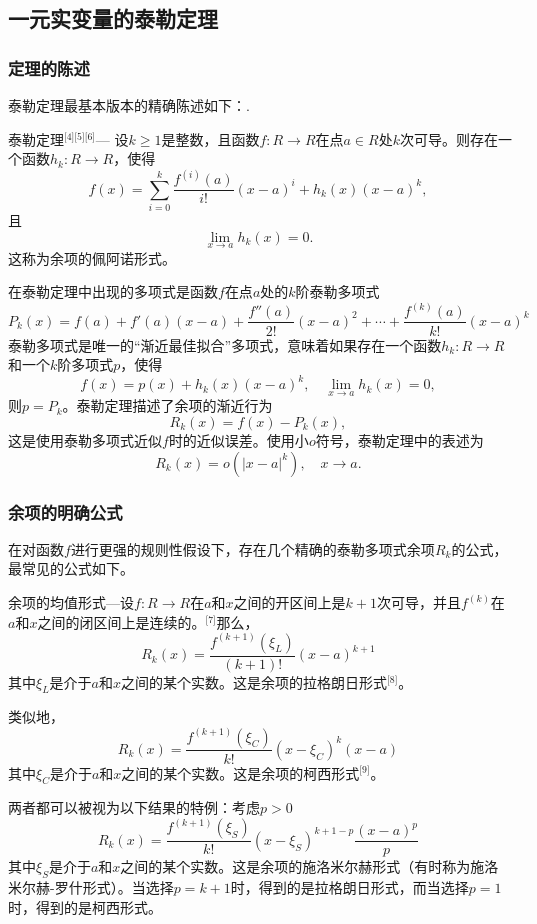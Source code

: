 \subsection{一元实变量的泰勒定理} 
\subsubsection{定理的陈述}  
泰勒定理最基本版本的精确陈述如下：.

泰勒定理\(^\text{[4][5][6]}\)— 设\( k \geq 1 \)是整数，且函数\( f : R\to R\)在点\(a \in R\)处\( k \)次可导。则存在一个函数\( h_k : R\to R\)，使得
\[
f(x) = \sum_{i=0}^{k} \frac{f^{(i)}(a)}{i!} (x - a)^i + h_k(x)(x - a)^k,~
\]
且
\[
\lim_{x \to a} h_k(x) = 0.~
\]
这称为余项的佩阿诺形式。

在泰勒定理中出现的多项式是函数\( f \)在点\( a \)处的\( k \)阶泰勒多项式
\[
P_k(x) = f(a) + f'(a)(x - a) + \frac{f''(a)}{2!}(x - a)^2 + \cdots + \frac{f^{(k)}(a)}{k!}(x - a)^k~
\]
泰勒多项式是唯一的“渐近最佳拟合”多项式，意味着如果存在一个函数\( h_k : R \to R\) 和一个\( k \)阶多项式\( p \)，使得
\[
f(x) = p(x) + h_k(x)(x - a)^k, \quad \lim_{x \to a} h_k(x) = 0,~
\]
则\( p = P_k \)。泰勒定理描述了余项的渐近行为
\[
R_k(x) = f(x) - P_k(x),~
\]
这是使用泰勒多项式近似\( f \)时的近似误差。使用小\( o \)符号，泰勒定理中的表述为
\[
R_k(x) = o(|x - a|^k), \quad x \to a.~
\]
\subsubsection{余项的明确公式}  
在对函数\( f \)进行更强的规则性假设下，存在几个精确的泰勒多项式余项\( R_k \)的公式，最常见的公式如下。

余项的均值形式—设\( f : R \to R \)在\( a \)和\( x \)之间的开区间上是\( k + 1 \)次可导，并且\( f^{(k)} \)在\( a \)和\( x \)之间的闭区间上是连续的。\(^\text{[7]}\)那么，
\[
R_k(x) = \frac{f^{(k+1)}(\xi_L)}{(k+1)!}(x - a)^{k+1}~
\]
其中\( \xi_L \)是介于\( a \)和\( x \)之间的某个实数。这是余项的拉格朗日形式\(^\text{[8]}\)。

类似地，
\[
R_k(x) = \frac{f^{(k+1)}(\xi_C)}{k!}(x - \xi_C)^k(x - a)~
\]
其中\( \xi_C \)是介于\( a \)和\( x \)之间的某个实数。这是余项的柯西形式\(^\text{[9]}\)。

两者都可以被视为以下结果的特例：考虑\( p > 0 \)
\[
R_k(x) = \frac{f^{(k+1)}(\xi_S)}{k!}(x - \xi_S)^{k+1-p} \frac{(x - a)^p}{p}~
\]
其中\( \xi_S \)是介于\( a \)和\( x \)之间的某个实数。这是余项的施洛米尔赫形式（有时称为施洛米尔赫-罗什形式）。当选择\( p = k + 1 \)时，得到的是拉格朗日形式，而当选择\( p = 1 \)时，得到的是柯西形式。

